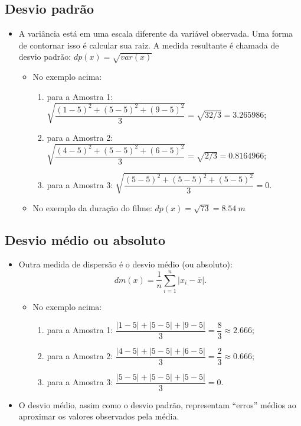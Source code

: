 \documentclass[
]{book}
\providecommand{\tightlist}{%
  \setlength{\itemsep}{0pt}\setlength{\parskip}{0pt}}
\begin{document}
\subsection{Desvio padrão}\label{desvio-padruxe3o}

\begin{itemize}
\tightlist
\item
  A variância está em uma escala diferente da variável observada. Uma forma de contornar isso é calcular sua raiz. A medida resultante é chamada de desvio padrão: \(dp(x) = \sqrt{var(x)}\)

  \begin{itemize}
  \tightlist
  \item
    No exemplo acima:

    \begin{enumerate}
    \def\labelenumi{\arabic{enumi}.}
    \tightlist
    \item
      para a Amostra 1: \(\sqrt{\dfrac{(1-5)^2+(5-5)^2+(9-5)^2}{3}}=\sqrt{32/3}=3.265986\);
    \item
      para a Amostra 2: \(\sqrt{\dfrac{(4-5)^2+(5-5)^2+(6-5)^2}{3}}=\sqrt{2/3}=0.8164966\);
    \item
      para a Amostra 3: \(\sqrt{\dfrac{(5-5)^2+(5-5)^2+(5-5)^2}{3}}=0\).
    \end{enumerate}
  \item
    No exemplo da duração do filme: \(dp(x) = \sqrt{73}=8.54~m\)
  \end{itemize}
\end{itemize}

\subsection{Desvio médio ou absoluto}\label{desvio-muxe9dio-ou-absoluto}

\begin{itemize}
\tightlist
\item
  Outra medida de dispersão é o desvio médio (ou absoluto): \[dm(x) = \frac{1}{n}\sum_{i=1}^n \left|x_i - \bar{x}\right|.\]

  \begin{itemize}
  \tightlist
  \item
    No exemplo acima:

    \begin{enumerate}
    \def\labelenumi{\arabic{enumi}.}
    \tightlist
    \item
      para a Amostra 1: \({\dfrac{|1-5|+|5-5|+|9-5|}{3}}=\dfrac{8}{3} \approx 2.666\);
    \item
      para a Amostra 2: \({\dfrac{|4-5|+|5-5|+|6-5|}{3}}=\dfrac{2}{3} \approx 0.666\);
    \item
      para a Amostra 3: \({\dfrac{|5-5|+|5-5|+|5-5|}{3}}=0\).
    \end{enumerate}
  \end{itemize}
\item
  O desvio médio, assim como o desvio padrão, representam ``erros'' médios ao aproximar os valores observados pela média.
\end{itemize}
\end{document}
